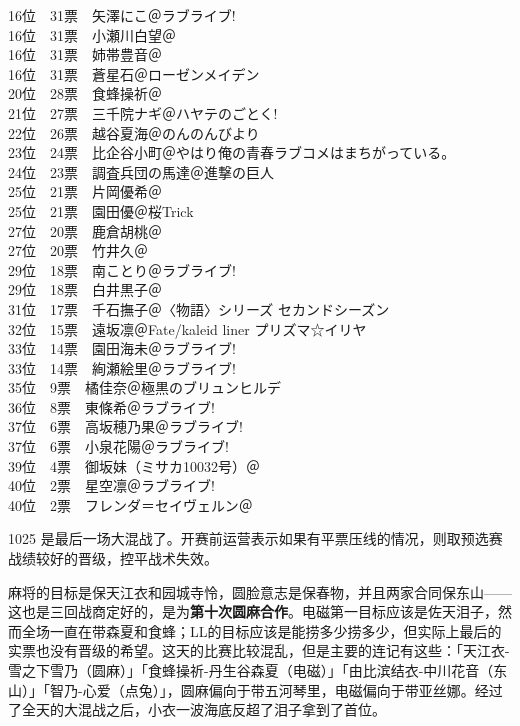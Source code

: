 {    16位　31票　矢澤にこ＠ラブライブ!\\
    16位　31票　小瀬川白望＠\Saki\\
    16位　31票　姉帯豊音＠\Saki\\
    16位　31票　蒼星石＠ローゼンメイデン\\
    20位　28票　食蜂操祈＠\Railgan\\
    21位　27票　三千院ナギ＠ハヤテのごとく!\\
    22位　26票　越谷夏海＠のんのんびより\\
    23位　24票　比企谷小町＠やはり俺の青春ラブコメはまちがっている。\\
    24位　23票　調査兵団の馬達＠進撃の巨人\\
    25位　21票　片岡優希＠\Saki\\
    25位　21票　園田優＠桜Trick\\
    27位　20票　鹿倉胡桃＠\Saki\\
    27位　20票　竹井久＠\Saki\\
    29位　18票　南ことり＠ラブライブ!\\
    29位　18票　白井黒子＠\Railgan\\
    31位　17票　千石撫子＠〈物語〉シリーズ セカンドシーズン\\
    32位　15票　遠坂凛＠Fate/kaleid liner プリズマ☆イリヤ\\
    33位　14票　園田海未＠ラブライブ!\\
    33位　14票　絢瀬絵里＠ラブライブ!\\
    35位　9票　橘佳奈＠極黒のブリュンヒルデ\\
    36位　8票　東條希＠ラブライブ!\\
    37位　6票　高坂穂乃果＠ラブライブ!\\
    37位　6票　小泉花陽＠ラブライブ!\\
    39位　4票　御坂妹（ミサカ10032号）＠\Railgan\\
    40位　2票　星空凛＠ラブライブ!\\
    40位　2票　フレンダ＝セイヴェルン＠\Railgan
}

1025 是最后一场大混战了。开赛前运营表示如果有平票压线的情况，则取预选赛战绩较好的晋级，控平战术失效。

麻将的目标是保天江衣和园城寺怜，圆脸意志是保春物，并且两家合同保东山——这也是三回战商定好的，是为\textbf{第十次圆麻合作}。电磁第一目标应该是佐天泪子，然而全场一直在带森夏和食蜂；LL的目标应该是能捞多少捞多少，但实际上最后的实票也没有晋级的希望。这天的比赛比较混乱，但是主要的连记有这些：「天江衣-雪之下雪乃（圆麻）」「食蜂操祈-丹生谷森夏（电磁）」「由比滨结衣-中川花音（东山）」「智乃-心爱（点兔）」，圆麻偏向于带五河琴里，电磁偏向于带亚丝娜。经过了全天的大混战之后，小衣一波海底反超了泪子拿到了首位。

